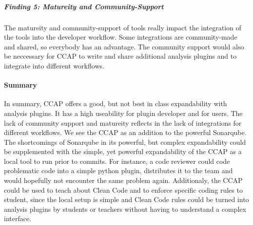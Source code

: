 \subparagraph{Finding 5: Matureity and Community-Support}
The matureity and community-support of tools really impact the integration of the tools into the developer workflow. Some integrations are community-made and shared, so everybody has an advantage. The community support would also be neccessary for CCAP to write and share additional analysis plugins and to integrate into different workflows.

\paragraph{Summary}
In summary, CCAP offers a good, but not best in class expandability with analysis plugins. It has a high useability for plugin developer and for users. The lack of community support and matureity reflects in the lack of integrations for different workflows. 
We see the CCAP as an addition to the powerful Sonarqube. The shortcomings of Sonarqube in its powerful, but complex expandability could be supplemented with the simple, yet powerful expandability of the CCAP as a local tool to run prior to commits. For instance, a code reviewer could code problematic code into a simple python plugin, distributes it to the team and would hopefully not encounter the same problem again.
Additionaly, the CCAP could be used to teach about Clean Code and to enforce specific coding rules to student, since the local setup is simple and Clean Code rules could be turned into analysis plugins by students or teachers without having to understand a complex interface.
